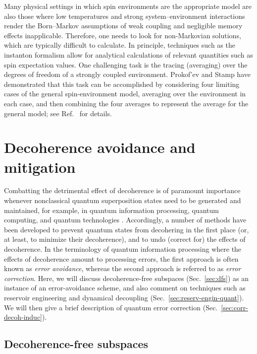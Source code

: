 \documentclass[3p,sort&compress]{elsarticle}
\begin{document}
Many physical settings in which spin environments are the appropriate model are also those where low temperatures and strong system--environment interactions render the Born--Markov assumptions of weak coupling and negligible memory effects inapplicable. Therefore, one needs to look for non-Markovian solutions, which are typically difficult to calculate. In principle, techniques such as the instanton formalism \cite{Prokofev:2000:zz} allow for analytical calculations of relevant quantities such as spin expectation values. One challenging task is the tracing (averaging) over the degrees of freedom of a strongly coupled environment. Prokof'ev and Stamp \cite{Prokofev:2000:zz} have demonstrated that this task can be accomplished by considering four limiting cases of the general spin-environment model, averaging over the environment in each case, and then combining the four averages to represent the average for the general model; see Ref.~\cite{Prokofev:2000:zz} for details.

\section{\label{sec:decoh-errcorr}Decoherence avoidance and mitigation}

Combatting the detrimental effect of decoherence is of paramount importance whenever nonclassical quantum superposition states need to be generated and maintained, for example, in quantum information processing, quantum computing, and quantum technologies \cite{Dowling:2003:tv}. Accordingly, a number of methods have been developed to prevent quantum states from decohering in the first place (or, at least, to minimize their decoherence), and to undo (correct for) the effects of decoherence. In the terminology of quantum information processing where the effects of decoherence amount to processing errors, the first approach is often known as \emph{error avoidance}, whereas the second approach is referred to as \emph{error correction}. Here, we will discuss decoherence-free subspaces  (Sec.~\ref{sec:dfs}) as an instance of an error-avoidance scheme, and also comment on techniques such as reservoir engineering and dynamical decoupling (Sec.~\ref{sec:reserv-engin-quant}). We will then give a brief description of quantum error correction (Sec.~\ref{sec:corr-decoh-induc}).

\subsection{\label{sec:dfs}Decoherence-free subspaces}
\end{document}
